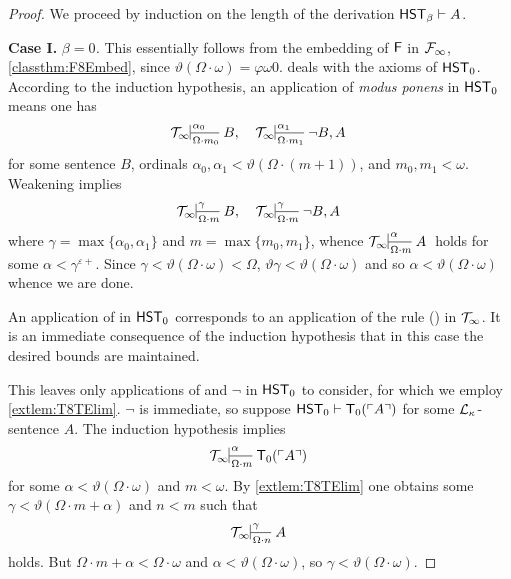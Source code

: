 \documentclass[UKenglish,cleveref,DIV=12]{scrartcl}
\theoremstyle{definition}
\theoremstyle{definition}
\begin{document}
\begin{proof} We proceed by induction on the length of the derivation $\mathsf{HST}_\beta\vdash A$.

\noindent\textbf{Case I.} \textit{${\beta=0}$.} This essentially follows from the
embedding of $\mathsf{F}$ in $\mathcal{F}_\infty$, \cref{classthm:F8Embed}, since $\vartheta(\Omega\cdot
\omega)=\varphi \omega0$.  deals with the axioms of $\mathsf{HST}_0$. According to the
induction hypothesis, an application of {\em modus ponens} in $\mathsf{HST}_0$ means one has
\begin{align*}%
 \Tinfty\prov{\alpha_0}{\Omega\cdot m_0}{B,}&&\Tinfty\prov{\alpha_1}{\Omega\cdot m_1}{\lnot B,A}
\end{align*}
for some sentence $B$, ordinals $\alpha_0,\alpha_1<\vartheta(\Omega\cdot (m+1))$, and
$m_0,m_1<\omega$. Weakening implies
\begin{align*}
 \Tinfty\prov{\gamma}{\Omega\cdot m}{B,}&&\Tinfty\prov{\gamma}{\Omega\cdot m}{\lnot B,A}
\end{align*}
where $\gamma=\max\{\alpha_0,\alpha_1\}$ and $m=\max\{m_0,m_1\}$, whence $\Tinfty\prov\alpha{\Omega\cdot m} A$ holds for some $\alpha<\gamma^{\varepsilon+}$. Since
$\gamma<\vartheta(\Omega\cdot \omega)<\Omega$, $\vartheta\gamma<\vartheta(\Omega\cdot \omega)$ and so $\alpha<\vartheta(\Omega\cdot \omega)$ whence we are done.

An application of  in $\mathsf{HST}_0$ corresponds to an application of the
rule () in $\mathcal{T}_\infty$. It is an immediate consequence of the induction hypothesis that in this case the desired bounds are maintained.

This leaves only applications of  and $\lnot$ in $\mathsf{HST}_0$
to consider, for which we employ \cref{extlem:T8TElim}. $\lnot$ is immediate, so suppose $\mathsf{HST}_0\vdash \mathsf{T}_0(\ulcorner{A}\urcorner)$ for some $\mathcal{L}_\kappa$-sentence $A$. The induction hypothesis implies
\begin{align}\label{eqn:T8embed3}
 \Tinfty\prov\alpha{\Omega\cdot m}{\T_0(\gn A)}
\end{align}
for some $\alpha<\vartheta(\Omega\cdot\omega)$ and $m<\omega$. By \cref{extlem:T8TElim} one obtains some $\gamma<\vartheta(\Omega\cdot m+\alpha)$ and $n<m$ such that
\begin{align*}
 \Tinfty\prov\gamma{\Omega\cdot n}{A}
\end{align*}
holds. But $\Omega\cdot m+\alpha<\Omega\cdot \omega$ and $\alpha<\vartheta(\Omega\cdot \omega)$, so $\gamma<\vartheta(\Omega\cdot\omega)$.


\end{proof}
\end{document}

